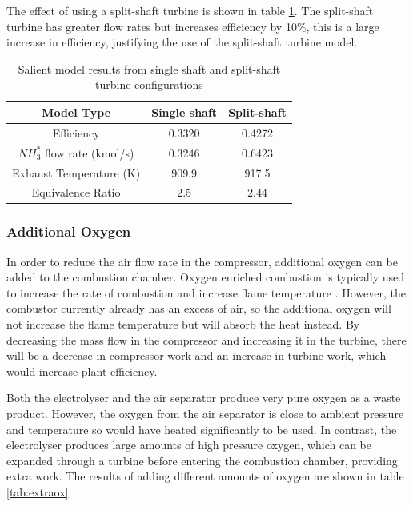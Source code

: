The effect of using a split-shaft turbine is shown in table \ref{tab:splitshaft}. The split-shaft turbine has greater flow rates but increases efficiency by 10\%, this is a large increase in efficiency, justifying the use of the split-shaft turbine model. 

\begin {table} [h]
\begin{center}
\caption{Salient model results from single shaft and split-shaft turbine configurations} \label{tab:splitshaft} 
\begin{tabular}{ |c|c|c| }
 \hline
  Model Type & Single shaft & Split-shaft\\ 
 \hline
  Efficiency & 0.3320 & 0.4272 \\ 
  \hline
  $NH_3^*$ flow rate (kmol/s) & 0.3246 & 0.6423\\ 
 \hline
  Exhaust Temperature (K) & 909.9 & 917.5\\
  \hline
  Equivalence Ratio & 2.5 & 2.44\\
 \hline
\end{tabular}
\end{center}  
\end {table} %

\subsubsection{Additional Oxygen}
In order to reduce the air flow rate in the compressor, additional oxygen can be added to the combustion chamber. Oxygen enriched combustion is typically used to increase the rate of combustion and increase flame temperature \cite{oxyfuel}. However, the combustor currently already has an excess of air, so the additional oxygen will not increase the flame temperature but will absorb the heat instead. By decreasing the mass flow in the compressor and increasing it in the turbine, there will be a decrease in compressor work and an increase in turbine work, which would increase plant efficiency. 

Both the electrolyser and the air separator produce very pure oxygen as a waste product. However, the oxygen from the air separator is close to ambient pressure and temperature so would have heated significantly to be used. In contrast, the electrolyser produces large amounts of high pressure oxygen, which can be expanded through a turbine before entering the combustion chamber, providing extra work. The results of adding different amounts of oxygen are shown in table \ref{tab:extraox}.

